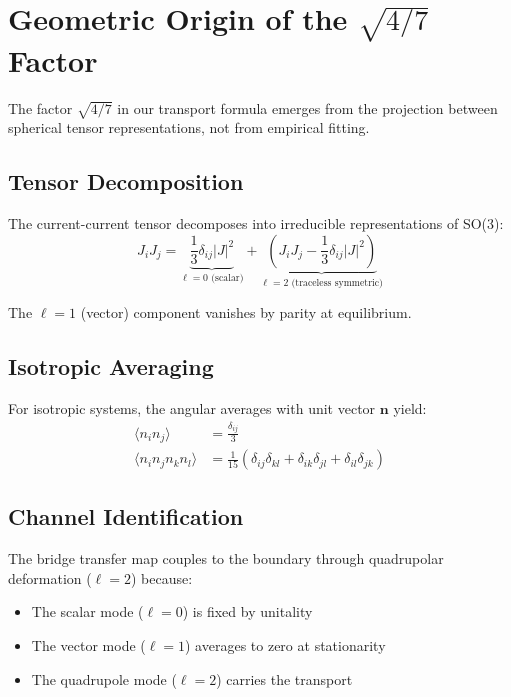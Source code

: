 \documentclass[12pt,letterpaper]{article}
\begin{document}
\section{Geometric Origin of the $\sqrt{4/7}$ Factor}

The factor $\sqrt{4/7}$ in our transport formula emerges from the projection between spherical tensor representations, not from empirical fitting.

\subsection{Tensor Decomposition}

The current-current tensor decomposes into irreducible representations of SO(3):
\begin{equation}
  J_i J_j = \underbrace{\frac{1}{3}\delta_{ij}|J|^2}_{\ell=0 \text{ (scalar)}} + \underbrace{\left(J_i J_j - \frac{1}{3}\delta_{ij}|J|^2\right)}_{\ell=2 \text{ (traceless symmetric)}}
\end{equation}

The $\ell=1$ (vector) component vanishes by parity at equilibrium.

\subsection{Isotropic Averaging}

For isotropic systems, the angular averages with unit vector $\mathbf{n}$ yield:
\begin{align}
  \langle n_i n_j \rangle &= \frac{\delta_{ij}}{3} \\
  \langle n_i n_j n_k n_l \rangle &= \frac{1}{15}(\delta_{ij}\delta_{kl} + \delta_{ik}\delta_{jl} + \delta_{il}\delta_{jk})
\end{align}

\subsection{Channel Identification}

The bridge transfer map couples to the boundary through quadrupolar deformation ($\ell=2$) because:
\begin{itemize}
  \item The scalar mode ($\ell=0$) is fixed by unitality
  \item The vector mode ($\ell=1$) averages to zero at stationarity
  \item The quadrupole mode ($\ell=2$) carries the transport
\end{itemize}
\end{document}
